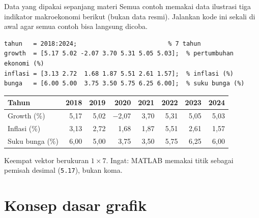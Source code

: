 \documentclass[10pt,aspectratio=169]{beamer}
\newcommand{\kd}[1]{\texttt{#1}}
\begin{document}
\begin{frame}[fragile]{Data yang dipakai sepanjang materi}
Semua contoh memakai data ilustrasi tiga indikator makroekonomi berikut (\alert{bukan} data resmi). Jalankan kode ini sekali di awal agar semua contoh bisa langsung dicoba.
\begin{lstlisting}[basicstyle=\ttfamily\footnotesize]
tahun   = 2018:2024;                         % 7 tahun
growth  = [5.17 5.02 -2.07 3.70 5.31 5.05 5.03];  % pertumbuhan ekonomi (%)
inflasi = [3.13 2.72  1.68 1.87 5.51 2.61 1.57];  % inflasi (%)
bunga   = [6.00 5.00  3.75 3.50 5.75 6.25 6.00];  % suku bunga (%)
\end{lstlisting}
\begin{center}\small
\begin{tabular}{lrrrrrrr}
\toprule
Tahun & 2018 & 2019 & 2020 & 2021 & 2022 & 2023 & 2024\\
\midrule
Growth (\%)     & 5,17 & 5,02 & $-$2,07 & 3,70 & 5,31 & 5,05 & 5,03\\
Inflasi (\%)    & 3,13 & 2,72 & 1,68 & 1,87 & 5,51 & 2,61 & 1,57\\
Suku bunga (\%) & 6,00 & 5,00 & 3,75 & 3,50 & 5,75 & 6,25 & 6,00\\
\bottomrule
\end{tabular}
\end{center}
{\small Keempat vektor berukuran $1\times 7$. Ingat: MATLAB memakai \alert{titik} sebagai pemisah desimal (\kd{5.17}), bukan koma.}
\end{frame}

\section{Konsep dasar grafik}
\end{document}
